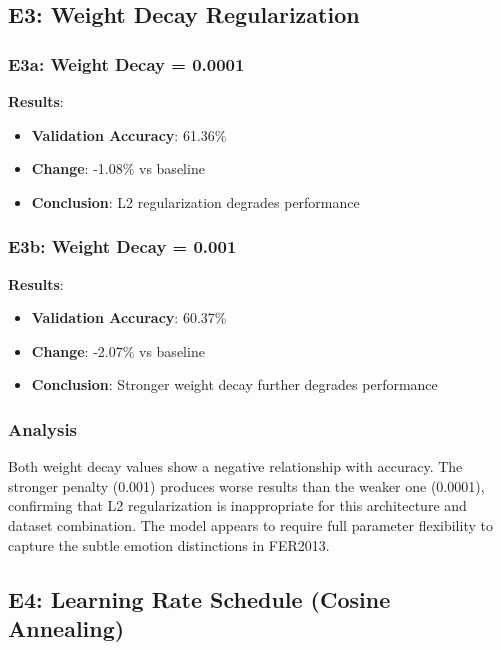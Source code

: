 \documentclass[12pt,a4paper]{article}
\begin{document}

\subsection{E3: Weight Decay Regularization}

\subsubsection{E3a: Weight Decay = 0.0001}
\textbf{Results}:
\begin{itemize}[leftmargin=*]
    \item \textbf{Validation Accuracy}: 61.36\%
    \item \textbf{Change}: -1.08\% vs baseline
    \item \textbf{Conclusion}: L2 regularization degrades performance
\end{itemize}

\subsubsection{E3b: Weight Decay = 0.001}
\textbf{Results}:
\begin{itemize}[leftmargin=*]
    \item \textbf{Validation Accuracy}: 60.37\%
    \item \textbf{Change}: -2.07\% vs baseline
    \item \textbf{Conclusion}: Stronger weight decay further degrades performance
\end{itemize}

\subsubsection{Analysis}
Both weight decay values show a negative relationship with accuracy. The stronger penalty (0.001) produces worse results than the weaker one (0.0001), confirming that L2 regularization is inappropriate for this architecture and dataset combination. The model appears to require full parameter flexibility to capture the subtle emotion distinctions in FER2013.


\subsection{E4: Learning Rate Schedule (Cosine Annealing)}
\end{document}
